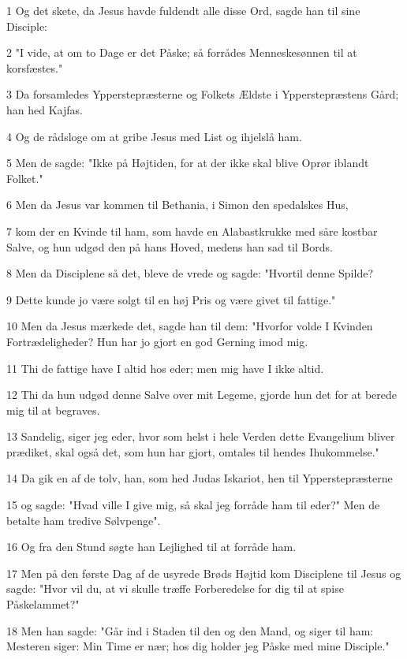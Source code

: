 \par 1 Og det skete, da Jesus havde fuldendt alle disse Ord, sagde han til sine Disciple:
\par 2 "I vide, at om to Dage er det Påske; så forrådes Menneskesønnen til at korsfæstes."
\par 3 Da forsamledes Ypperstepræsterne og Folkets Ældste i Ypperstepræstens Gård; han hed Kajfas.
\par 4 Og de rådsloge om at gribe Jesus med List og ihjelslå ham.
\par 5 Men de sagde: "Ikke på Højtiden, for at der ikke skal blive Oprør iblandt Folket."
\par 6 Men da Jesus var kommen til Bethania, i Simon den spedalskes Hus,
\par 7 kom der en Kvinde til ham, som havde en Alabastkrukke med såre kostbar Salve, og hun udgød den på hans Hoved, medens han sad til Bords.
\par 8 Men da Disciplene så det, bleve de vrede og sagde: "Hvortil denne Spilde?
\par 9 Dette kunde jo være solgt til en høj Pris og være givet til fattige."
\par 10 Men da Jesus mærkede det, sagde han til dem: "Hvorfor volde I Kvinden Fortrædeligheder? Hun har jo gjort en god Gerning imod mig.
\par 11 Thi de fattige have I altid hos eder; men mig have I ikke altid.
\par 12 Thi da hun udgød denne Salve over mit Legeme, gjorde hun det for at berede mig til at begraves.
\par 13 Sandelig, siger jeg eder, hvor som helst i hele Verden dette Evangelium bliver prædiket, skal også det, som hun har gjort, omtales til hendes Ihukommelse."
\par 14 Da gik en af de tolv, han, som hed Judas Iskariot, hen til Ypperstepræsterne
\par 15 og sagde: "Hvad ville I give mig, så skal jeg forråde ham til eder?" Men de betalte ham tredive Sølvpenge".
\par 16 Og fra den Stund søgte han Lejlighed til at forråde ham.
\par 17 Men på den første Dag af de usyrede Brøds Højtid kom Disciplene til Jesus og sagde: "Hvor vil du, at vi skulle træffe Forberedelse for dig til at spise Påskelammet?"
\par 18 Men han sagde: "Går ind i Staden til den og den Mand, og siger til ham: Mesteren siger: Min Time er nær; hos dig holder jeg Påske med mine Disciple."
